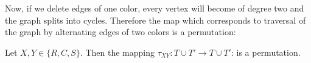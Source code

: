 Now, if we delete edges of one color, every vertex will become of degree two and the graph splits into cycles. Therefore the map which corresponds to traversal of the graph by alternating edges of two colors is a permutation:

\begin{lem}
Let $X,Y \in \{R,C,S\}$. Then the mapping $\tau_{XY} : T \cup T' \rightarrow T \cup T'$:
is a permutation.
\end{lem}






